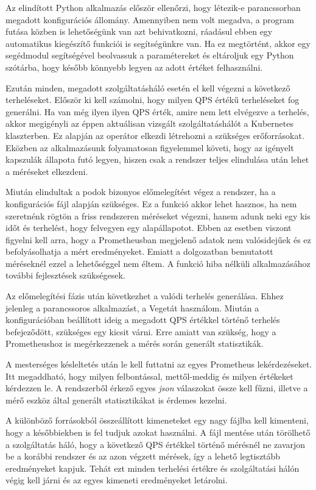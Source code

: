 Az elindított Python alkalmazás először ellenőrzi, hogy létezik-e parancssorban megadott konfigurációs állomány.
Amennyiben nem volt megadva, a program futása közben is lehetőségünk van azt behivatkozni, ráadásul ebben egy automatikus kiegészítő funkciói is segítségünkre van.
Ha ez megtörtént, akkor egy segédmodul segítségével beolvassuk a paramétereket és eltároljuk egy Python szótárba, hogy később könnyebb legyen az adott értéket felhasználni.

Ezután minden, megadott szolgáltatásháló esetén el kell végezni a következő terheléseket.
Először ki kell számolni, hogy milyen QPS értékű terheléseket fog generálni.
Ha van még ilyen ilyen QPS érték, amire nem lett elvégezve a terhelés, akkor megigényli az éppen aktuálisan vizsgált szolgáltatáshálót a Kubernetes klaszterben.
Ez alapján az operátor elkezdi létrehozni a szükséges erőforrásokat. 
Eközben az alkalmazásunk folyamatosan figyelemmel követi, hogy az igényelt kapszulák állapota futó legyen, hiszen csak a rendszer teljes elindulása után lehet a méréseket elkezdeni.

Miután elindultak a podok bizonyos előmelegítést végez a rendszer, ha a konfigurációs fájl alapján szükséges.
Ez a funkció akkor lehet hasznos, ha nem szeretnénk rögtön a friss rendszeren méréseket végezni, hanem adunk neki egy kis időt és terhelést, hogy felvegyen egy alapállapotot.
Ebben az esetben viszont figyelni kell arra, hogy a Prometheusban megjelenő adatok nem valósidejűek és ez befolyásolhatja a mért eredményeket.
Emiatt a dolgozatban bemutatott méréseknél ezzel a lehetőséggel nem éltem.
A funkció hiba nélküli alkalmazásához további fejlesztések szükségesek.

Az előmelegítési fázis után következhet a valódi terhelés generálása.
Ehhez jelenleg a parancssoros alkalmazást, a Vegetát használom.
Miután a konfigurációban beállított ideig a megadott QPS értékkel történő terhelés befejeződött, szükséges egy kicsit várni.
Erre amiatt van szükség, hogy a Prometheushoz is megérkezzenek a mérés során generált statisztikák.

A mesterséges késleltetés után le kell futtatni az egyes Prometheus lekérdezéseket.
Itt megaddható, hogy milyen felbontással, mettől-meddig és milyen értékeket kérdezzen le.
A rendszerből érkező egyes \textit{json} válaszokat össze kell fűzni, illetve a mérő eszköz által generált statisztikákat is érdemes kezelni.

A különböző forrásokból összeállított kimeneteket egy nagy fájlba kell kimenteni, hogy a későbbiekben is fel tudjuk azokat használni.
A fájl mentése után törölhető a szolgáltatás háló, hogy a következő QPS értékkel történő mérésnél ne zavarjon be a korábbi rendszer és az azon végzett  mérések, így a lehető legtisztább eredményeket kapjuk.
Tehát ezt minden terhelési értékre és szolgáltatási hálón végig kell járni és az egyes kimeneti eredményeket letárolni.

